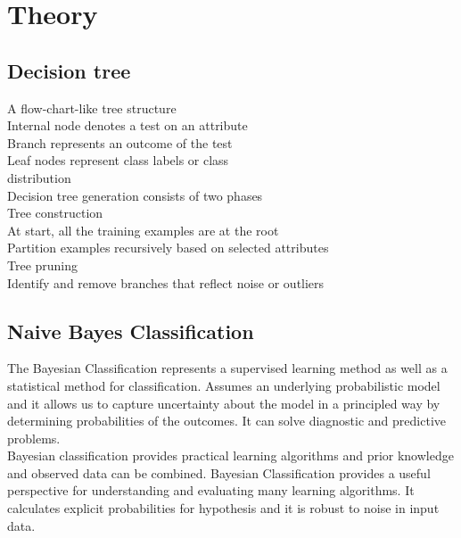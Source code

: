 \documentclass[12pt]{article}
\begin{document}
\section{Theory}
\subsection{Decision tree}
A flow-chart-like tree structure\\
Internal node denotes a test on an attribute\\
Branch represents an outcome of the test\\
Leaf nodes represent class labels or class\\ distribution\\
Decision tree generation consists of two phases\\
Tree construction\\
At start, all the training examples are at the root\\
Partition examples recursively based on selected attributes\\
Tree pruning\\
Identify and remove branches that reflect noise or outliers\\

\subsection{Naive Bayes Classification}
The Bayesian Classification represents a supervised learning method as well as a statistical method for classification. Assumes an underlying probabilistic model and it allows us to capture uncertainty about the model in a principled way by determining probabilities of the outcomes. It can solve diagnostic and predictive problems.\\ 
Bayesian classification provides practical learning algorithms and prior knowledge and observed data can be combined. Bayesian Classification provides a useful perspective for understanding and evaluating many learning algorithms. It calculates explicit probabilities for hypothesis and it is robust to noise in input data.\\
\end{document}
